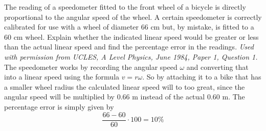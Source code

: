 \begin{problem}[A1984PIQ1l]
{The reading of a speedometer fitted to the front wheel of a bicycle is directly proportional to the angular speed of the wheel. A certain speedometer is correctly calibrated for use with a wheel of diameter $66\textrm{ cm}$ but, by mistake, is fitted to a $60\textrm{ cm}$ wheel. Explain whether the indicated linear speed would be greater or less than the actual linear speed and find the percentage error in the readings. }
{\textit{Used with permission from UCLES, A Level Physics, June 1984, Paper 1, Question 1.}}
{The speedometer works by recording the angular speed $\omega$ and converting that into a linear speed using the formula $v=r\omega$. So by attaching it to a bike that has a smaller wheel radius the calculated linear speed will to too great, since the angular speed will be multiplied by $0.66\textrm{ m}$ instead of the actual $0.60\textrm{ m}$. The percentage error is simply given by 
\begin{equation*} \frac{66-60}{60}\cdot100=10\% \end{equation*}
}
\end{problem}